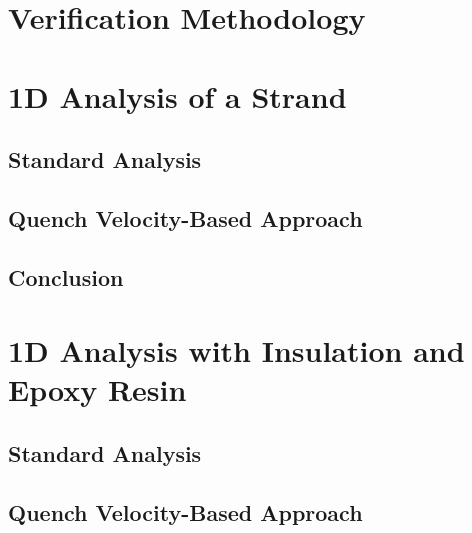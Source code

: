\documentclass[11pt,a4paper]{report}
\begin{document}
\section{Verification Methodology}
\label{section:quench_velocity_benchmarking_benchmarking_methodology}


\section{1D Analysis of a Strand}
\label{section:quench_velocity_benchmarking_no_insulation}

\subsection{Standard Analysis}
\label{section:quench_velocity_benchmarking_no_insulation_heat_balance}


\subsection{Quench Velocity-Based Approach}
\label{section:quench_velocity_benchmarking_no_insulation_quench_velocity}


\subsection{Conclusion}


\section{1D Analysis with Insulation and Epoxy Resin}
\label{section:quench_velocity_benchmarking_with_insulation}

\subsection{Standard Analysis}
\label{section:quench_velocity_benchmarking_with_insulation_heat_balance}


\subsection{Quench Velocity-Based Approach}
\label{section:quench_velocity_benchmarking_with_insulation_quench_velocity}

\end{document}
